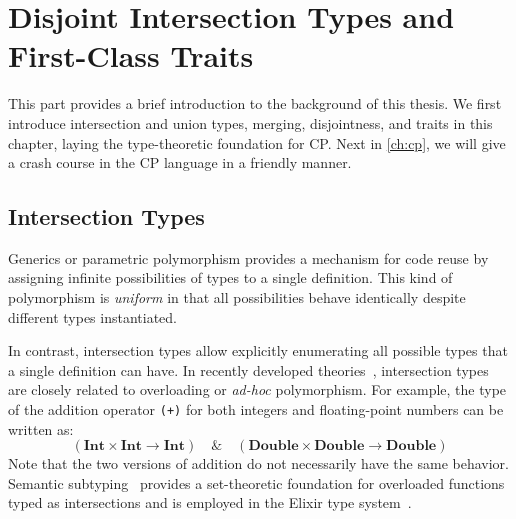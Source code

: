 \chapter{Disjoint Intersection Types and First-Class Traits} \label{ch:background}

This part provides a brief introduction to the background of this thesis. We
first introduce intersection and union types, merging, disjointness, and traits
in this chapter, laying the type-theoretic foundation for CP. Next in
\autoref{ch:cp}, we will give a crash course in the CP language in a friendly manner.

\newcommand{\tand}{\,\&\,}
\newcommand{\tor}{\,|\,}
\newcommand{\sub}{\;<:\;}

\section{Intersection Types}

Generics or parametric polymorphism provides a mechanism for code reuse by
assigning infinite possibilities of types to a single definition. This kind of
polymorphism is \emph{uniform} in that all possibilities behave identically
despite different types instantiated.

In contrast, intersection types allow explicitly enumerating all possible types
that a single definition can have. In recently developed
theories~\citep{dunfield2014elaborating,castagna2023programming}, intersection
types are closely related to overloading or \emph{ad-hoc} polymorphism. For
example, the type of the addition operator \lstinline{(+)} for both integers and
floating-point numbers can be written as:
\begin{equation*}
(\mathbf{Int} \times \mathbf{Int} \to \mathbf{Int}) \quad\&\quad
(\mathbf{Double} \times \mathbf{Double} \to \mathbf{Double})
\end{equation*}
Note that the two versions of addition do not necessarily have the same
behavior. Semantic subtyping~\citep{frisch2008semantic} provides a
set-theoretic foundation for overloaded functions typed as intersections and is
employed in the Elixir type system~\citep{castagna2023design}.

